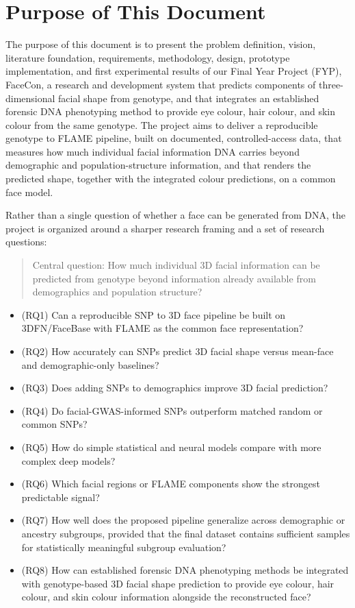 \section{Purpose of This Document}
The purpose of this document is to present the problem definition, vision, literature foundation, requirements, methodology, design, prototype implementation, and first experimental results of our Final Year Project (FYP), FaceCon, a research and development system that predicts components of three-dimensional facial shape from genotype, and that integrates an established forensic DNA phenotyping method to provide eye colour, hair colour, and skin colour from the same genotype. The project aims to deliver a reproducible genotype to FLAME pipeline, built on documented, controlled-access data, that measures how much individual facial information DNA carries beyond demographic and population-structure information, and that renders the predicted shape, together with the integrated colour predictions, on a common face model.

Rather than a single question of whether a face can be generated from DNA, the project is organized around a sharper research framing and a set of research questions:

\begin{quote}
Central question: How much individual 3D facial information can be predicted from genotype beyond information already available from demographics and population structure?
\end{quote}

\begin{itemize}
\item (RQ1) Can a reproducible SNP to 3D face pipeline be built on 3DFN/FaceBase with FLAME as the common face representation?
\item (RQ2) How accurately can SNPs predict 3D facial shape versus mean-face and demographic-only baselines?
\item (RQ3) Does adding SNPs to demographics improve 3D facial prediction?
\item (RQ4) Do facial-GWAS-informed SNPs outperform matched random or common SNPs?
\item (RQ5) How do simple statistical and neural models compare with more complex deep models?
\item (RQ6) Which facial regions or FLAME components show the strongest predictable signal?
\item (RQ7) How well does the proposed pipeline generalize across demographic or ancestry subgroups, provided that the final dataset contains sufficient samples for statistically meaningful subgroup evaluation?
\item (RQ8) How can established forensic DNA phenotyping methods be integrated with genotype-based 3D facial shape prediction to provide eye colour, hair colour, and skin colour information alongside the reconstructed face?
\end{itemize}

